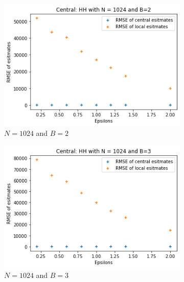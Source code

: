 \documentclass[11pt]{article}
\theoremstyle{definition}
\begin{document}
\begin{figure}[H]
\centering
\begin{subfigure}{.3\textwidth}
  \centering
  \includegraphics[width=\linewidth]{figures/cen_vs_loc/hh/hh_beat_flat=1024_B=2.png}
  \caption{$N=1024$ and $B=2$}
  \label{fig:hh_vs32}
\end{subfigure}%
\begin{subfigure}{.3\textwidth}
  \centering
  \includegraphics[width=\linewidth]{figures/cen_vs_loc/hh/hh_beat_flat=1024_B=3.png}
  \caption{$N=1024$ and $B=3$}
  \label{fig:hh_vs256}
\end{subfigure}%
\begin{subfigure}{.3\textwidth}
  \centering

\end{subfigure}
\end{figure}
\end{document}
